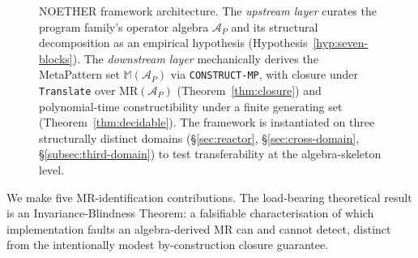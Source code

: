 \documentclass[acmsmall,screen,review]{acmart}
\begin{document}
\begin{figure}[h]
{%
}
\caption{NOETHER framework architecture. The
\emph{upstream layer} curates the program family's operator algebra
$\mathcal{A}_P$ and its structural decomposition as an empirical
hypothesis (Hypothesis~\ref{hyp:seven-blocks}). The \emph{downstream
layer} mechanically derives the MetaPattern set
$\mathbb{M}(\mathcal{A}_P)$ via \texttt{CONSTRUCT-MP}, with closure
under \texttt{Translate} over $\mathrm{MR}(\mathcal{A}_P)$
(Theorem~\ref{thm:closure}) and polynomial-time constructibility under a
finite generating set (Theorem~\ref{thm:decidable}). The framework
is instantiated on three structurally distinct domains
(\S\ref{sec:reactor}, \S\ref{sec:cross-domain}, \S\ref{subsec:third-domain})
to test transferability at the algebra-skeleton level.}
\label{fig:noether-arch}
\end{figure}

We make five MR-identification contributions. The load-bearing theoretical result is an Invariance-Blindness Theorem: a falsifiable characterisation of which implementation faults an algebra-derived MR can and cannot detect, distinct from the intentionally modest by-construction closure guarantee.
\end{document}
